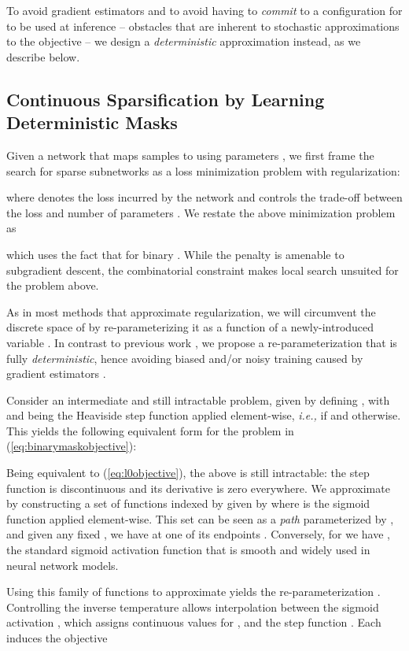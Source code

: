 \documentclass{article}
\def\eqref#1{equation~\ref{#1}}
\newcommand{\ie}{\textit{i.e.,} }
\renewcommand{\eqref}[1]{(\ref{#1})}
\begin{document}
To avoid gradient estimators and to avoid having to \emph{commit} to a configuration for  to be used at inference -- obstacles that are inherent to stochastic approximations to the  objective -- we design a \emph{deterministic} approximation instead, as we describe below.

\subsection{Continuous Sparsification by Learning Deterministic Masks}



Given a network  that maps samples  to  using parameters , we first frame the search for sparse subnetworks as a loss minimization problem with  regularization:

where  denotes the loss incurred by the network  and  controls the trade-off between the loss and number of parameters . We restate the above minimization problem as

which uses the fact that  for binary . While the  penalty is amenable to subgradient descent, the combinatorial constraint  makes local search unsuited for the problem above.

As in most methods that approximate  regularization, we will circumvent the discrete space of  by re-parameterizing it as a function of a newly-introduced variable . In contrast to previous work \cite{sparsityl0,l0bernoulli}, we propose a re-parameterization that is fully \emph{deterministic}, hence avoiding biased and/or noisy training caused by gradient estimators \cite{straightthrough}.

Consider an intermediate and still intractable problem, given by defining , with  and  being the Heaviside step function applied element-wise, \ie  if  and  otherwise. This yields the following equivalent form for the problem in \eqref{eq:binarymaskobjective}:

Being equivalent to \eqref{eq:l0objective}, the above is still intractable: the step function  is discontinuous and its derivative is zero everywhere. We approximate  by constructing a set of functions indexed by  given by  where  is the sigmoid function  applied element-wise. This set can be seen as a \emph{path} parameterized by , and given any fixed , we have at one of its endpoints . Conversely, for  we have , the standard sigmoid activation function that is smooth and widely used in neural network models.

Using this family of functions to approximate  yields the re-parameterization . Controlling the inverse temperature  allows interpolation between the sigmoid activation , which assigns continuous values for , and the step function . Each  induces the objective
\end{document}
